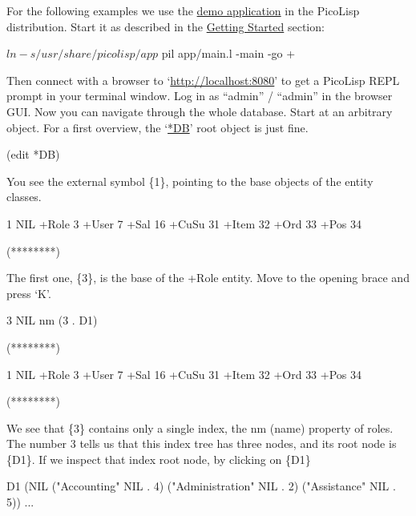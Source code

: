 For the following examples we use the
\href{http://software-lab.de/doc/app.html#minApp}{demo application} in the
PicoLisp distribution. Start it as described in the
\href{http://software-lab.de/doc/app.html#getStarted}{Getting Started}
section:


\begin{wideverbatim}
$ ln -s /usr/share/picolisp/app
$ pil app/main.l -main -go +
\end{wideverbatim}

Then connect with a browser to
`\href{http://localhost:8080}{http://localhost:8080}' to get a PicoLisp
REPL prompt in your terminal window. Log in as ``admin'' / ``admin'' in the
browser GUI.
 Now you can navigate through the whole database. Start at an arbitrary
object. For a first overview, the
`\href{http://software-lab.de/doc/refD.html#*DB}{*DB}' root object is just
fine.


\begin{wideverbatim}
(edit *DB)
\end{wideverbatim}

You see the external symbol \{1\}, pointing to the base objects of the
entity classes.


\begin{wideverbatim}
{1} NIL
   +Role {3}
   +User {7}
   +Sal {16}
   +CuSu {31}
   +Item {32}
   +Ord {33}
   +Pos {34}

(********)
\end{wideverbatim}

The first one, \{3\}, is the base of the +Role entity. Move to the opening
brace and press `K'.


\begin{wideverbatim}
{3} NIL
   nm (3 . {D1})

(********)

{1} NIL
   +Role {3}
   +User {7}
   +Sal {16}
   +CuSu {31}
   +Item {32}
   +Ord {33}
   +Pos {34}

(********)
\end{wideverbatim}

We see that \{3\} contains only a single index, the nm (name) property of
roles. The number 3 tells us that this index tree has three nodes, and
its root node is \{D1\}.
 If we inspect that index root node, by clicking on \{D1\}


\begin{wideverbatim}
{D1} (NIL ("Accounting" NIL . {4}) ("Administration" NIL . {2}) ("Assistance" NIL . {5}))
...
\end{wideverbatim}

